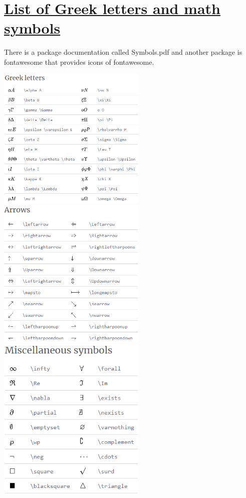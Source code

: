 \section{\href{https://www.overleaf.com/learn/latex/List_of_Greek_letters_and_math_symbols}{List of Greek letters and math symbols}}
There is a package documentation called Symbols.pdf and another package is fontawesome that provides icons of fontawesome.
\begin{center}
	\includegraphics[width=200pt]{Source Images/Greek Letters.png}
	\includegraphics[width=200pt]{Source Images/Arrows.png}
	\includegraphics[width=200pt]{Source Images/Miscellaneous symbols.png}

\end{center}
